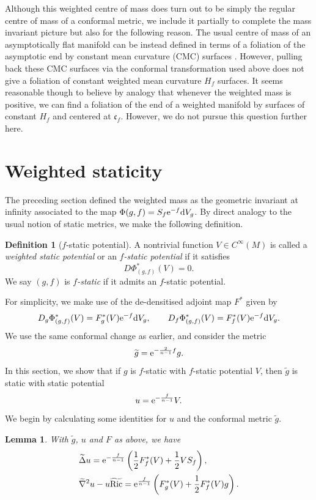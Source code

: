 \documentclass[10pt,a4paper]{amsart}
\numberwithin{equation}{section}
\newtheorem{Lemma}[Theorem]{Lemma}
\theoremstyle{definition}
\newtheorem{Definition}[Theorem]{Definition}
\begin{document}
Although this weighted centre of mass does turn out to be simply the regular centre of mass of a conformal metric, we include it partially to complete the mass invariant picture but also for the following reason. The usual centre of mass of an asymptotically flat manifold can be instead defined in terms of a foliation of the asymptotic end by constant mean curvature (CMC) surfaces \cite{HuiskenYau96}. However, pulling back these CMC surfaces via the conformal transformation used above does not give a foliation of constant weighted mean curvature $H_f$ surfaces. It seems reasonable though to believe by analogy that whenever the weighted mass is positive, we can find a foliation of the end of a weighted manifold by surfaces of constant $H_f$ and centered at $\mathfrak c_f$. However, we do not pursue this question further here.

\section{Weighted staticity}\label{sec-f-static}

The preceding section defined the weighted mass as the geometric invariant at infinity associated to the map $\Phi(g,f)=S_f{\rm e}^{-f}{\rm d}V_g$. By direct analogy to the usual notion of static metrics, we make the following definition.

\begin{Definition}[$f$-static potential]\label{def-f-static}
	A nontrivial function $V\in C^\infty(M)$ is called a \emph{weighted static potential} or an \emph{$f$-static potential} if it satisfies
	\[
	D\Phi_{(g,f)}^*(V)=0.
	\]
	We say $(g,f)$ is \emph{$f$-static} if it admits an $f$-static potential.
\end{Definition}
For simplicity, we make use of the de-densitised adjoint map $F^*$ given by
\begin{equation*}%
	D_g\Phi^*_{(g,f)}(V)=F_g^*(V) {\rm e}^{-f}{\rm d}V_g,
	\qquad
	D_f\Phi^*_{(g,f)}(V)=F_f^*(V) {\rm e}^{-f}{\rm d}V_g.
\end{equation*}
We use the same conformal change as earlier, and consider the metric
\[
\widetilde g = {\rm e}^{-\frac{2}{n-1}f} g.
\]
In this section, we show that if $g$ is $f$-static with $f$-static potential $V$, then $\widetilde g$ is static with static potential
\[
u={\rm e}^{-\frac{f}{n-1}}V.
\]
We begin by calculating some identities for $u$ and the conformal metric $\widetilde g$.

\begin{Lemma}\label{lem-fstatic-conf-identities}
	With $\widetilde g$, $u$ and $F$ as above, we have
	\begin{align}
		\label{eq-conf-lap}
&		\widetilde\Delta u
={\rm e}^{-\frac{f}{n-1}}\left(\frac12 F_f^*(V)+\frac12 V S_f\right),\\
		\label{eq-conf-hessric}
&		\widetilde\nabla^2 u-u \widetilde{\mathrm{Ric}}
={\rm e}^{\frac{f}{n-1}}\left(F_g^*(V)+\frac12 F_f^*(V) g\right).
	\end{align}
\end{Lemma}
\end{document}
